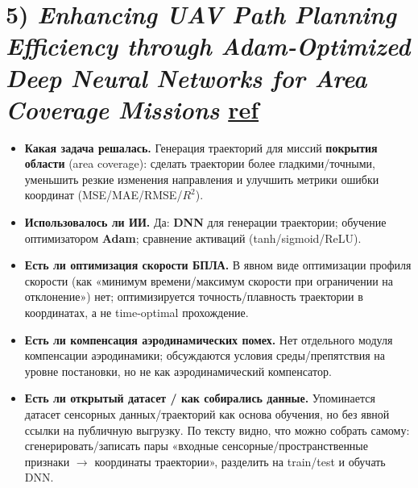 \section*{5) \textit{Enhancing UAV Path Planning Efficiency through Adam-Optimized Deep Neural Networks for Area Coverage Missions} \href{https://www.sciencedirect.com/science/article/pii/S1877050924006707}{ref}}
\begin{itemize}
  \item \textbf{Какая задача решалась.}
  Генерация траекторий для миссий \textbf{покрытия области} (area coverage): сделать траектории более гладкими/точными, уменьшить резкие изменения направления и улучшить метрики ошибки координат (MSE/MAE/RMSE/$R^2$).

  \item \textbf{Использовалось ли ИИ.}
  Да: \textbf{DNN} для генерации траектории; обучение оптимизатором \textbf{Adam}; сравнение активаций (tanh/sigmoid/ReLU).

  \item \textbf{Есть ли оптимизация скорости БПЛА.}
  В явном виде оптимизации профиля скорости (как «минимум времени/максимум скорости при ограничении на отклонение») нет; оптимизируется точность/плавность траектории в координатах, а не time-optimal прохождение.

  \item \textbf{Есть ли компенсация аэродинамических помех.}
  Нет отдельного модуля компенсации аэродинамики; обсуждаются условия среды/препятствия на уровне постановки, но не как аэродинамический компенсатор.

  \item \textbf{Есть ли открытый датасет / как собирались данные.}
  Упоминается датасет сенсорных данных/траекторий как основа обучения, но без явной ссылки на публичную выгрузку.
  По тексту видно, что можно собрать самому: сгенерировать/записать пары «входные сенсорные/пространственные признаки $\to$ координаты траектории», разделить на train/test и обучать DNN.
\end{itemize}

